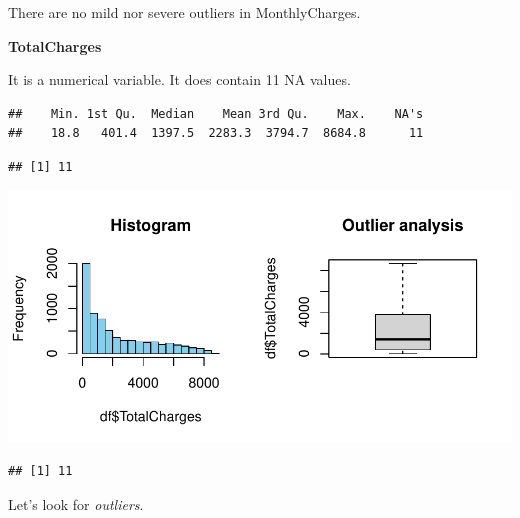 \documentclass[
  twoside]{article}
\newenvironment{Shaded}{\begin{snugshade}}{\end{snugshade}}
\newcommand{\CommentTok}[1]{\textcolor[rgb]{0.56,0.35,0.01}{\textit{#1}}}
\newcommand{\FloatTok}[1]{\textcolor[rgb]{0.00,0.00,0.81}{#1}}
\newcommand{\FunctionTok}[1]{\textcolor[rgb]{0.13,0.29,0.53}{\textbf{#1}}}
\newcommand{\NormalTok}[1]{#1}
\newcommand{\OtherTok}[1]{\textcolor[rgb]{0.56,0.35,0.01}{#1}}
\newcommand{\SpecialCharTok}[1]{\textcolor[rgb]{0.81,0.36,0.00}{\textbf{#1}}}
\newcommand{\StringTok}[1]{\textcolor[rgb]{0.31,0.60,0.02}{#1}}
\begin{document}
There are no mild nor severe outliers in MonthlyCharges.

\textbf{TotalCharges}

It is a numerical variable. It does contain 11 NA values.

\begin{verbatim}
##    Min. 1st Qu.  Median    Mean 3rd Qu.    Max.    NA's 
##    18.8   401.4  1397.5  2283.3  3794.7  8684.8      11
\end{verbatim}

\begin{verbatim}
## [1] 11
\end{verbatim}

\includegraphics{Assigment2_files/figure-latex/unnamed-chunk-35-1.pdf}

\begin{verbatim}
## [1] 11
\end{verbatim}

Let's look for \emph{outliers}.

\begin{Shaded}
\end{Shaded}
\end{document}

